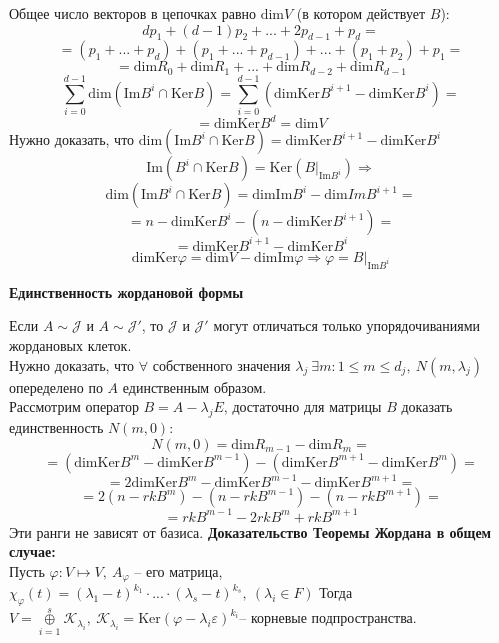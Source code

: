 \documentclass[a4paper, 12pt]{article}
\theoremstyle{definition}
\begin{document}
    Общее число векторов в цепочках равно $\text{dim}V$
    (в котором действует $B$):
    $$dp_1 + (d-1)p_2 + ... + 2p_{d-1} + p_d =$$
    $$ =(p_1 +...+ p_d) + (p_1 + ... + p_{d-1}) +...+ (p_1 + p_2)
    + p_1 = $$
    $$= \text{dim}R_0 + \text{dim}R_1 +...+ \text{dim}R_{d-2}
    + \text{dim}R_{d-1}$$
    $$\sum\limits_{i=0}^{d-1}\text{dim}(\text{Im}B^i \cap 
    \text{Ker}B) = \sum\limits_{i=0}^{d-1}(\text{dimKer}B^
    {i+1} - \text{dimKer}B^i) =$$
    $$= \text{dimKer}B^d = \text{dim}V$$
    Нужно доказать, что $\text{dim}(\text{Im}B^i \cap \text{Ker}B) = 
    \text{dimKer}B^{i+1} - \text{dimKer}B^i$
    $$\text{Im}(B^i \cap \text{Ker}B) = \text{Ker}(B|_{\text{Im}B^i}) 
    \Longrightarrow$$ $$\text{dim}(\text{Im}B^i \cap \text{Ker}B) = 
    \text{dimIm}B^i - \text{dim}ImB^{i+1}=$$ $$= n - \text{dimKer}B^i
    - (n - \text{dimKer}B^{i+1})=$$ $$= \text{dimKer}B^{i+1} - 
    \text{dimKer}B^i$$$$
    \text{dimKer}\varphi = \text{dim}V - \text{dimIm}\varphi \Longrightarrow \varphi = B|_{\text{Im}B^i}$$
    \begin{center}
        \textbf{Единственность жордановой формы} 
    \end{center}
    Если $A \sim \mathcal{J} $ и $A \sim \mathcal{J}'$,
    то $\mathcal{J} $ и $\mathcal{J} '$ могут отличаться
    только упорядочиваниями жордановых клеток.\\
    Нужно доказать, что $\forall$ собственного значения $
    \lambda_j\ \exists m: 1 \leq m \leq d_j,\ N(m,\lambda_j)$  
    опеределено по $A$ единственным образом.\\
    Рассмотрим оператор $B = A - \lambda_j E$, достаточно
    для матрицы $B$ доказать единственность $N(m, 0):$
    $$N(m,0) = \text{dim}R_{m-1} - \text{dim}R_m = $$
    $$=(\text{dimKer}B^m - \text{dimKer}B^{m-1}) - 
    (\text{dimKer}B^{m+1} - \text{dimKer}B^m) = $$
    $$ = 2\text{dimKer}B^m - \text{dimKer}B^{m-1} - \text{dimKer}B^{m+1} =$$
    $$ =2(n - rkB^m) - (n - rkB^{m-1}) - (n - rkB^{m+1}) =$$
    $$=rkB^{m-1} - 2rkB^{m} + rkB^{m+1}$$
    Эти ранги не зависят от базиса.
    \newpage
    \textbf{Доказательство Теоремы Жордана в общем случае:}\\
    Пусть $\varphi: V \longmapsto V,\ A_\varphi$ -- его 
    матрица, $\chi_\varphi(t) = (\lambda_1 - t)^{k_1}\cdot...
    \cdot (\lambda_s - t)^{k_s},\ (\lambda_i \in F)$
    Тогда $V = \overset{s}{\underset{i=1}{\oplus}}\mathcal{K}_{\lambda_i},\  \mathcal{K}_{\lambda_i} = \text{Ker}(    
    \varphi - \lambda_i \varepsilon)^{k_i}$-- корневые
    подпространства.\\
\end{document}
